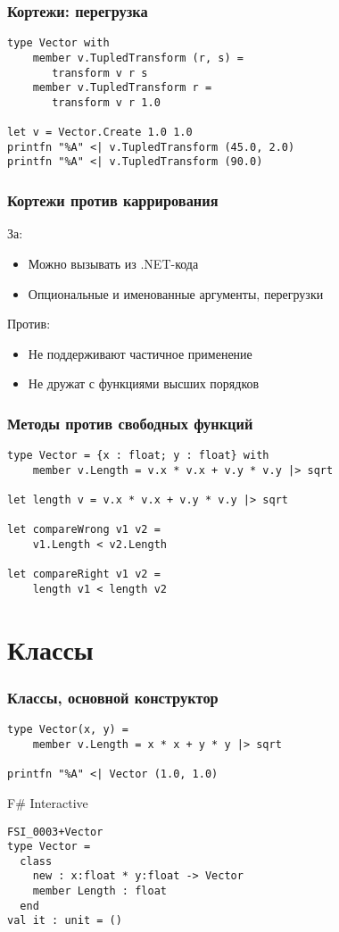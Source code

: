 \documentclass[xetex,mathserif,serif]{beamer}
\begin{document}
	\begin{frame}[fragile]
		\frametitle{Кортежи: перегрузка}
		\begin{verbatim}
type Vector with
    member v.TupledTransform (r, s) = 
       transform v r s
    member v.TupledTransform r = 
       transform v r 1.0

let v = Vector.Create 1.0 1.0
printfn "%A" <| v.TupledTransform (45.0, 2.0)
printfn "%A" <| v.TupledTransform (90.0)
		\end{verbatim}
\end{frame}

	\begin{frame}
		\frametitle{Кортежи против каррирования}
		За:
		\begin{itemize}
			\item Можно вызывать из .NET-кода
			\item Опциональные и именованные аргументы, перегрузки
		\end{itemize}
		Против:
		\begin{itemize}
			\item Не поддерживают частичное применение
			\item Не дружат с функциями высших порядков
		\end{itemize}
	\end{frame}

	\begin{frame}[fragile]
		\frametitle{Методы против свободных функций}
		\begin{verbatim}
type Vector = {x : float; y : float} with
    member v.Length = v.x * v.x + v.y * v.y |> sqrt
   
let length v = v.x * v.x + v.y * v.y |> sqrt

let compareWrong v1 v2 =
    v1.Length < v2.Length

let compareRight v1 v2 =
    length v1 < length v2
		\end{verbatim}
\end{frame}

	\section{Классы}
 
	\begin{frame}[fragile]
		\frametitle{Классы, основной конструктор}
		\begin{verbatim}
type Vector(x, y) = 
    member v.Length = x * x + y * y |> sqrt

printfn "%A" <| Vector (1.0, 1.0)
		\end{verbatim}

		\begin{alertblock}{F\# Interactive}
			\begin{verbatim}
FSI_0003+Vector
type Vector =
  class
    new : x:float * y:float -> Vector
    member Length : float
  end
val it : unit = ()
			\end{verbatim}
		\end{alertblock}
\end{frame}
\end{document}
